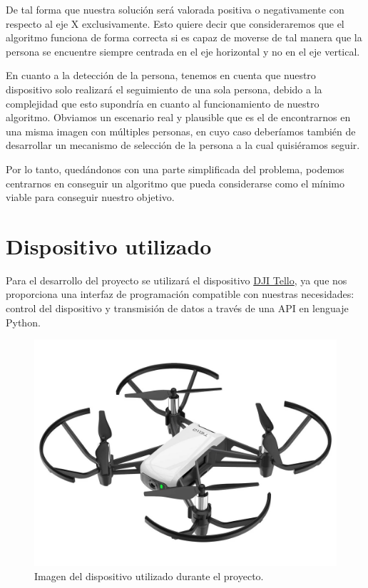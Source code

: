 De tal forma que nuestra solución será valorada positiva o negativamente con respecto al eje X exclusivamente. Esto quiere decir que consideraremos que el algoritmo funciona de forma correcta si es capaz de moverse de tal manera que la persona se encuentre siempre centrada en el eje horizontal y no en el eje vertical.
\medskip

En cuanto a la detección de la persona, tenemos en cuenta que nuestro dispositivo solo realizará el seguimiento de una sola persona, debido a la complejidad que esto supondría en cuanto al funcionamiento de nuestro algoritmo. Obviamos un escenario real y plausible que es el de encontrarnos en una misma imagen con múltiples personas, en cuyo caso deberíamos también de desarrollar un mecanismo de selección de la persona a la cual quisiéramos seguir.
\medskip

Por lo tanto, quedándonos con una parte simplificada del problema, podemos centrarnos en conseguir un algoritmo que pueda considerarse como el mínimo viable para conseguir nuestro objetivo.
\medskip

\section{Dispositivo utilizado}
\label{dispositivo-utilizado}

Para el desarrollo del proyecto se utilizará el dispositivo \href{https://store.dji.com/de/shop/tello-series}{DJI Tello}, ya que nos proporciona una interfaz de programación compatible con nuestras necesidades: control del dispositivo y transmisión de datos a través de una API en lenguaje Python.
\medskip


\begin{figure}[ht!]
  \centering
  \includegraphics[scale=0.2]{figuras/dispositivo_utilizado.png}
  \caption[DJI Tello. Dispositivo utilizado durante el proyecto]{Imagen del dispositivo utilizado durante el proyecto.}
  \label{fig-dron}
\end{figure}


